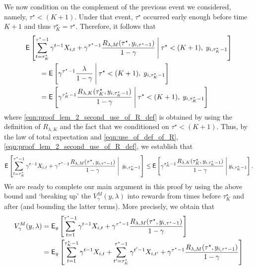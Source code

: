 \begin{myproof}[Proof.]
	We now condition on the complement of the previous event we considered, namely, $\tau^\star < (K+1)$. Under that event, $\tau^\star$ occurred early enough before time $K+1$ and thus $\tau^\star_K = \tau^\star$. Therefore, it follows that
	\begin{align} 
	&\E\left[\sum_{t=\tau_K^\star}^{\tau^\star-1}\gamma^{t-1} X_{i,t} + \gamma^{\tau^\star-1} \frac{R_{\lambda,M}(\tau^\star, y_{i,\tau^\star-1})}{1-\gamma}
	\given[\Bigg] \tau^\star < (K+1), \;y_{i,\tau^\star_K-1} \right] \nonumber  \\
	&\qquad = \E\left[\gamma^{\tau^\star-1}  \frac{\lambda}{1-\gamma}
	\given[\Bigg]\tau^\star < (K+1), \; y_{i,\tau^\star_K-1} \right] \nonumber \\
	&\qquad = \E\left[\gamma^{\tau^\star_K-1}  \frac{R_{\lambda,K}(\tau^\star_K, y_{i,\tau^\star_K-1})}{1-\gamma}
	\given[\Bigg]\tau^\star < (K+1), \; y_{i,\tau^\star_K-1} \right] \label{eqn:proof_lem_2_second_use_of_R_def}
	\end{align}
	where \eqref{eqn:proof_lem_2_second_use_of_R_def} is obtained by using the definition of $R_{\lambda,K}$ and the fact that we conditioned on $\tau^\star < (K+1)$. Thus, by the law of total expectation and \eqref{eqn:use_of_def_of_R}, \eqref{eqn:proof_lem_2_second_use_of_R_def}, we establish that
	\begin{equation} \label{ineq:proof_lem_2_main_bound_in_proof}
	\E\left[\sum_{t=\tau_K^\star}^{\tau^\star-1}\gamma^{t-1} X_{i,t} + \gamma^{\tau^\star-1} \frac{R_{\lambda,M}(\tau^\star, y_{i,\tau^\star-1})}{1-\gamma}
	\given[\Bigg] \;y_{i,\tau^\star_K-1} \right] \le \Ee{\gamma^{\tau^\star_K-1}  \frac{R_{\lambda,K}(\tau^\star_K, y_{i,\tau^\star_K-1})}{1-\gamma} \given[\Bigg] y_{i,\tau^\star_K-1}}.
	\end{equation}
	We are ready to complete our main argument in this proof by using the above bound and `breaking up' the $V_\gamma^M(y, \lambda)$ into rewards from times before $\tau_K^\star$ and after (and bounding the latter terms). More precisely, we obtain that
	\begin{align}
	V_\gamma^M(y,\lambda) & = \E_{y}\left[\sum_{t=1}^{\tau^\star-1}\gamma^{t-1} X_{i,t} + \gamma^{\tau^\star-1}\frac{R_{\lambda,M}(\tau^\star, y_{i,\tau^\star-1})}{1-\gamma}\right] \\
	& = \E_{y}\left[\sum_{t=1}^{\tau^\star_K-1}\gamma^{t-1} X_{i,t} + \sum_{t'=\tau^\star_K}^{\tau^\star-1}\gamma^{t'-1} X_{i,t'} +  \gamma^{\tau^\star-1}\frac{R_{\lambda,M}(\tau^\star, y_{i,\tau^\star-1})}{1-\gamma}\right] \nonumber \\

\end{align}
\end{myproof}
